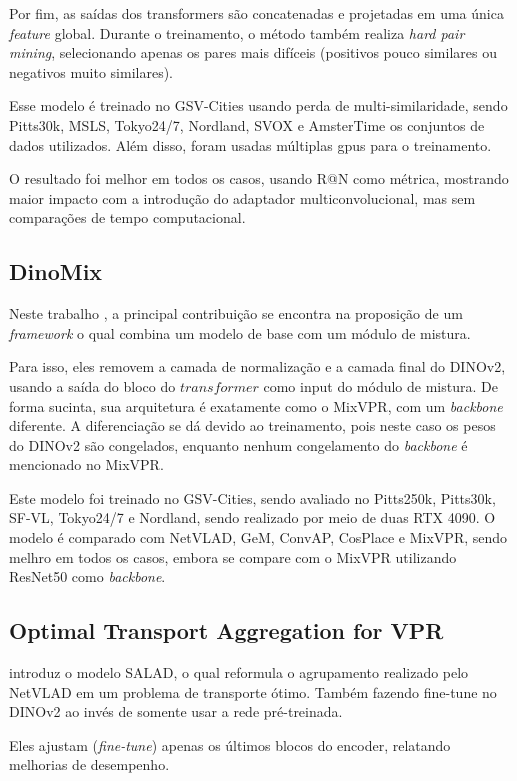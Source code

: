 \documentclass[letterpaper, 10 pt, conference]{ieeeconf}  %
\begin{document}
Por fim, as saídas dos transformers são concatenadas e projetadas em uma única \textit{feature} global. Durante o treinamento, o método também realiza \textit{hard pair mining}, selecionando apenas os pares mais difíceis (positivos pouco similares ou negativos muito similares).

Esse modelo é treinado no GSV-Cities usando perda de multi-similaridade, sendo Pitts30k, MSLS, Tokyo24/7, Nordland, SVOX e AmsterTime os conjuntos de dados utilizados. Além disso, foram usadas múltiplas gpus para o treinamento. 

O resultado foi melhor em todos os casos, usando R@N como métrica, mostrando maior impacto com a introdução do adaptador multiconvolucional, mas sem comparações de tempo computacional.

\subsection{DinoMix}

Neste trabalho \cite{dino}, a principal contribuição se encontra na proposição de um \textit{framework} o qual combina um modelo de base com um módulo de mistura.

Para isso, eles removem a camada de normalização e a camada final do DINOv2, usando a saída do bloco do $transformer$ como input do módulo de mistura. De forma sucinta, sua arquitetura é exatamente como o MixVPR, com um \textit{backbone} diferente. A diferenciação se dá devido ao treinamento, pois neste caso os pesos do DINOv2 são congelados, enquanto nenhum congelamento do \textit{backbone} é mencionado no MixVPR.

Este modelo foi treinado no GSV-Cities, sendo avaliado no Pitts250k, Pitts30k, SF-VL, Tokyo24/7 e Nordland, sendo realizado por meio de duas RTX 4090.  O modelo é comparado com NetVLAD, GeM, ConvAP, CosPlace e MixVPR, sendo melhro em todos os casos, embora se compare com o MixVPR utilizando ResNet50 como \textit{backbone}. 


\subsection{Optimal Transport Aggregation for VPR}

\cite{optimaltrans} introduz o modelo SALAD, o qual reformula o agrupamento realizado pelo NetVLAD em um problema de transporte ótimo. Também fazendo fine-tune no DINOv2 ao invés de somente usar a rede pré-treinada.

Eles ajustam (\textit{fine-tune}) apenas os últimos blocos do encoder, relatando melhorias de desempenho. 
\end{document}
